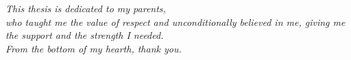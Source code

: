\cleardoublepage
\begin{citazioni}
\begin{flushright}
\textit{This thesis is dedicated to my parents,\\who taught me the value of respect and unconditionally believed in me, giving me\\the support and the strength I needed.\\From the bottom of my hearth, thank you.}
\end{flushright}
\end{citazioni}